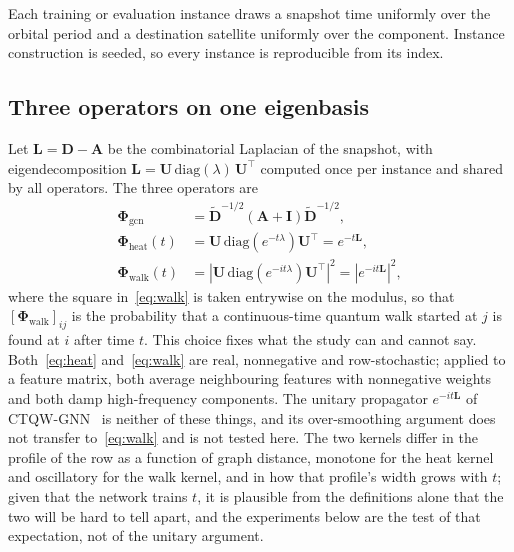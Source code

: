 \documentclass[preprint,11pt,3p]{elsarticle}
\newcommand{\Lap}{\mathbf{L}}
\newcommand{\Phiop}{\boldsymbol{\Phi}}
\begin{document}
\begin{table}[htbp]
\centering
\caption{The four shells. All use +Grid links; the main grids keep the seam links, so each
snapshot is a 4-regular torus, and the seam-cut arm of Section~\ref{sec:seam} removes them. The
two largest are scale-ups of the Starlink shell-1 geometry and are not deployed constellations.}
\label{tab:shells}

\end{table}

Each training or evaluation instance draws a snapshot time uniformly over the orbital period
and a destination satellite uniformly over the component. Instance construction is seeded, so
every instance is reproducible from its index.

\subsection{Three operators on one eigenbasis}
\label{sec:operators}

Let $\Lap = \mathbf{D} - \mathbf{A}$ be the combinatorial Laplacian of the snapshot, with
eigendecomposition $\Lap = \mathbf{U}\,\mathrm{diag}(\lambda)\,\mathbf{U}^{\top}$ computed once
per instance and shared by all operators. The three operators are
\begin{align}
\Phiop_{\mathrm{gcn}} &= \tilde{\mathbf{D}}^{-1/2}(\mathbf{A}+\mathbf{I})\tilde{\mathbf{D}}^{-1/2}, \label{eq:gcn}\\
\Phiop_{\mathrm{heat}}(t) &= \mathbf{U}\,\mathrm{diag}\!\left(e^{-t\lambda}\right)\mathbf{U}^{\top}
  = e^{-t\Lap}, \label{eq:heat}\\
\Phiop_{\mathrm{walk}}(t) &= \left|\mathbf{U}\,\mathrm{diag}\!\left(e^{-it\lambda}\right)\mathbf{U}^{\top}\right|^{2}
  = \left|e^{-it\Lap}\right|^{2}, \label{eq:walk}
\end{align}
where the square in~\eqref{eq:walk} is taken entrywise on the modulus, so that
$[\Phiop_{\mathrm{walk}}]_{ij}$ is the probability that a continuous-time quantum walk started
at $j$ is found at $i$ after time $t$. This choice fixes what the study can and cannot say.
Both~\eqref{eq:heat} and~\eqref{eq:walk} are real, nonnegative and row-stochastic; applied to a
feature matrix, both average neighbouring features with nonnegative weights and both damp
high-frequency components. The unitary propagator $e^{-it\Lap}$ of CTQW-GNN~\cite{ctqwgnn} is
neither of these things, and its over-smoothing argument does not transfer to~\eqref{eq:walk}
and is not tested here. The two kernels differ in the profile of the row as a function of graph
distance, monotone for the heat kernel and oscillatory for the walk kernel, and in how that
profile's width grows with $t$; given that the network trains $t$, it is plausible from the
definitions alone that the two will be hard to tell apart, and the experiments below are the
test of that expectation, not of the unitary argument.
\end{document}

